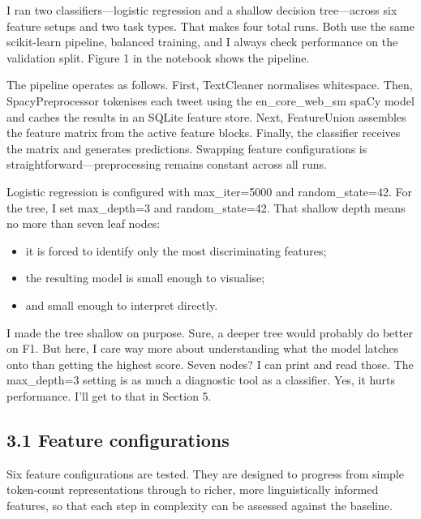 \documentclass[12pt]{article}
\begin{document}
I ran two classifiers---logistic regression and a shallow decision tree---across six feature setups and two task types. That makes four total runs. Both use the same scikit-learn pipeline, balanced training, and I always check performance on the validation split. Figure 1 in the notebook shows the pipeline.

The pipeline operates as follows. First, TextCleaner normalises whitespace. Then, SpacyPreprocessor tokenises each tweet using the en\_core\_web\_sm spaCy model and caches the results in an SQLite feature store. Next, FeatureUnion assembles the feature matrix from the active feature blocks. Finally, the classifier receives the matrix and generates predictions. Swapping feature configurations is straightforward---preprocessing remains constant across all runs.

Logistic regression is configured with max\_iter=5000 and random\_state=42. For the tree, I set max\_depth=3 and random\_state=42. That shallow depth means no more than seven leaf nodes:

\begin{itemize}

  \item it is forced to identify only the most discriminating features;

  \item the resulting model is small enough to visualise;

  \item and small enough to interpret directly.

\end{itemize}

I made the tree shallow on purpose. Sure, a deeper tree would probably do better on F1. But here, I care way more about understanding what the model latches onto than getting the highest score. Seven nodes? I can print and read those. The max\_depth=3 setting is as much a diagnostic tool as a classifier. Yes, it hurts performance. I'll get to that in Section 5.



\subsection*{3.1 Feature configurations}



Six feature configurations are tested. They are designed to progress from simple token-count representations through to richer, more linguistically informed features, so that each step in complexity can be assessed against the baseline.
\end{document}
